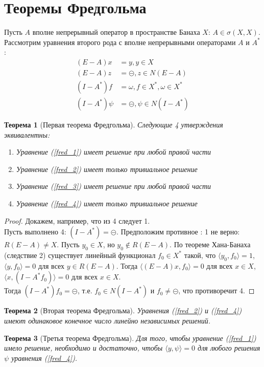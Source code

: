 \documentclass[12pt,a4paper,titlepage,oneside]{book}
\theoremstyle{definition}
\theoremstyle{plain}
\newtheorem*{theorem}{Теорема}
\theoremstyle{remark}
\theoremstyle{remark}
\theoremstyle{remark}
\theoremstyle{remark}
\theoremstyle{plain}
\theoremstyle{plain}
\begin{document}
\section{Теоремы Фредгольма}
Пусть $A$ вполне непрерывный оператор в пространстве Банаха $X$: $A \in \sigma(X,X)$. Рассмотрим уравнения второго рода с вполне непрерывными операторами $A$ и $A^*$:
\begin{align}
(E - A)x &= y , y \in X \label{fred_1}\\
(E - A)z &= \circleddash, z \in N(E-A) \label{fred_2}\\
(I - A^*)f &= \omega , f \in X^*, \omega \in X^* \label{fred_3}\\
(I - A^*)\psi &= \circleddash, \psi \in N(I - A^*) \label{fred_4}
\end{align}
\begin{theorem}[Первая теорема Фредгольма]
Следующие 4 утверждения эквивалентны:
\begin{enumerate}
\item Уравнение (\ref{fred_1}) имеет решение при любой правой части
\item Уравнение (\ref{fred_2}) имеет только тривиальное решение
\item Уравнение (\ref{fred_3}) имеет решение при любой правой части
\item Уравнение (\ref{fred_4}) имеет только тривиальное решение
\end{enumerate}
\end{theorem}
\begin{proof}
Докажем, например, что из 4 следует 1.\\
Пусть выполнено 4: $(I - A^*)=\circleddash$. Предположим противное : 1 не верно: $R(E - A)\neq X$. Пусть $y_0 \in X$, но $y_0 \not \in R(E - A)$. По теореме Хана-Банаха (следствие 2) существует линейный функционал $f_0 \in X^*$ такой, что $ \langle y_0,f_0 \rangle =1$, $ \langle y,f_0 \rangle =0$ для всех $y \in R(E-A)$. Тогда $ \langle (E-A)x,f_0 \rangle =0$ для всех $x \in X$, $ \langle x,(I-A^*f_0) \rangle =0$ для всех $x \in X$.\\
Тогда $(I-A^*)f_0=\circleddash$, т.е. $f_0 \in N(I-A^*)$ и $f_0 \neq \circleddash$, что противоречит 4.
\end{proof}
\begin{theorem}[Вторая теорема Фредгольма]
Уравнения (\ref{fred_2}) и (\ref{fred_4}) имеют одинаковое конечное число линейно независимых решений.
\end{theorem}
\begin{theorem}[Третья теорема Фредгольма]
Для того, чтобы уравнение (\ref{fred_1}) имело решение, необходимо и достаточно, чтобы $ \langle y,\psi \rangle =0$ для любого решения $\psi$ уравнения (\ref{fred_4}).
\end{theorem}
\end{document}
